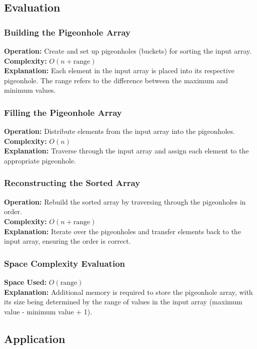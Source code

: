 \subsection{Evaluation}

\subsubsection{Building the Pigeonhole Array}
\textbf{Operation:} Create and set up pigeonholes (buckets) for sorting the input array. \\
\textbf{Complexity:} \(O(n + \text{range})\) \\
\textbf{Explanation:} Each element in the input array is placed into its respective pigeonhole. The range refers to the difference between the maximum and minimum values.

\subsubsection{Filling the Pigeonhole Array}
\textbf{Operation:} Distribute elements from the input array into the pigeonholes. \\
\textbf{Complexity:} \(O(n)\) \\
\textbf{Explanation:} Traverse through the input array and assign each element to the appropriate pigeonhole.

\subsubsection{Reconstructing the Sorted Array}
\textbf{Operation:} Rebuild the sorted array by traversing through the pigeonholes in order. \\
\textbf{Complexity:} \(O(n + \text{range})\) \\
\textbf{Explanation:} Iterate over the pigeonholes and transfer elements back to the input array, ensuring the order is correct.

\subsubsection{Space Complexity Evaluation}
\textbf{Space Used:} \(O(\text{range})\) \\
\textbf{Explanation:} Additional memory is required to store the pigeonhole array, with its size being determined by the range of values in the input array (maximum value - minimum value + 1).

\subsection{Application}

